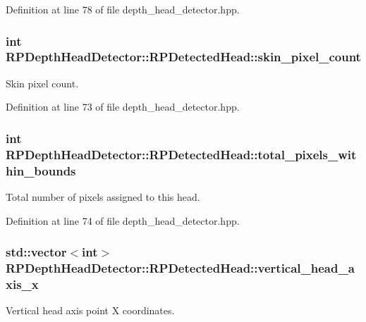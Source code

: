 \-Definition at line 78 of file depth\-\_\-head\-\_\-detector.\-hpp.

\hypertarget{struct_r_p_depth_head_detector_1_1_r_p_detected_head_ab34adf4b500187edd8eac4880ea6bfe9}{
\subsubsection[{skin\-\_\-pixel\-\_\-count}]{\setlength{\rightskip}{0pt plus 5cm}int {\bf \-R\-P\-Depth\-Head\-Detector\-::\-R\-P\-Detected\-Head\-::skin\-\_\-pixel\-\_\-count}}}\label{struct_r_p_depth_head_detector_1_1_r_p_detected_head_ab34adf4b500187edd8eac4880ea6bfe9}
\-Skin pixel count. 

\-Definition at line 73 of file depth\-\_\-head\-\_\-detector.\-hpp.

\hypertarget{struct_r_p_depth_head_detector_1_1_r_p_detected_head_a08df447be8416e1e442bf06745b74d8b}{
\subsubsection[{total\-\_\-pixels\-\_\-within\-\_\-bounds}]{\setlength{\rightskip}{0pt plus 5cm}int {\bf \-R\-P\-Depth\-Head\-Detector\-::\-R\-P\-Detected\-Head\-::total\-\_\-pixels\-\_\-within\-\_\-bounds}}}\label{struct_r_p_depth_head_detector_1_1_r_p_detected_head_a08df447be8416e1e442bf06745b74d8b}
\-Total number of pixels assigned to this head. 

\-Definition at line 74 of file depth\-\_\-head\-\_\-detector.\-hpp.

\hypertarget{struct_r_p_depth_head_detector_1_1_r_p_detected_head_a2458d0ecfa6876479380ec2902e1faa5}{
\subsubsection[{vertical\-\_\-head\-\_\-axis\-\_\-x}]{\setlength{\rightskip}{0pt plus 5cm}std\-::vector$<$int$>$ {\bf \-R\-P\-Depth\-Head\-Detector\-::\-R\-P\-Detected\-Head\-::vertical\-\_\-head\-\_\-axis\-\_\-x}}}\label{struct_r_p_depth_head_detector_1_1_r_p_detected_head_a2458d0ecfa6876479380ec2902e1faa5}
\-Vertical head axis point \-X coordinates. 

